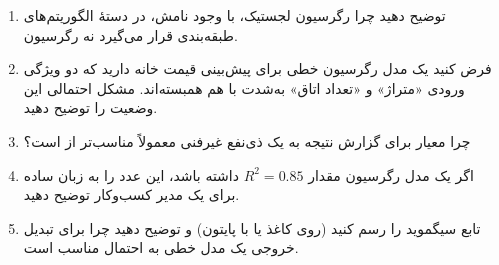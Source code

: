 \begin{enumerate}
    \item توضیح دهید چرا رگرسیون لجستیک، با وجود نامش، در دستهٔ
          الگوریتم‌های طبقه‌بندی قرار می‌گیرد نه رگرسیون.
    \item فرض کنید یک مدل رگرسیون خطی برای پیش‌بینی قیمت خانه دارید که
          دو ویژگی ورودی «متراژ» و «تعداد اتاق» به‌شدت با هم همبسته‌اند.
          مشکل احتمالی این وضعیت را توضیح دهید.
    \item چرا معیار  برای گزارش نتیجه به یک ذی‌نفع غیرفنی
          معمولاً مناسب‌تر از  است؟
    \item اگر یک مدل رگرسیون مقدار $R^2 = 0.85$ داشته باشد، این عدد را
          به زبان ساده برای یک مدیر کسب‌وکار توضیح دهید.
    \item تابع سیگموید را رسم کنید (روی کاغذ یا با پایتون) و توضیح دهید
          چرا برای تبدیل خروجی یک مدل خطی به احتمال مناسب است.
\end{enumerate}
